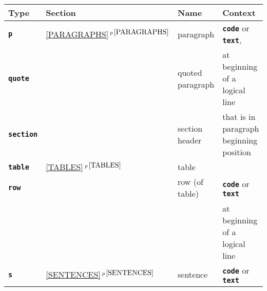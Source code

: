 \documentclass[12pt]{article}
\makeatletter
\newcommand{\TT}[1]{{\tt \bfseries #1}}
\newcommand{\ttkey}[1]{\TT{#1}\index{#1@{\tt #1}}}
\newcommand{\itemref}[1]{\ref{#1}$\,^{p\,\pageref{#1}}$}
\makeatother
\begin{document}
\begin{center}
\begin{tabular}{|l|l|l|l|}
\hline
\bf Type & \bf Section & \bf Name & \bf Context
\\\hline
\ttkey{p}	& \itemref{PARAGRAPHS} & paragraph
	& \TT{code} or \TT{text},
\\\cline{1-1}\cline{3-3}
\ttkey{quote}	& & quoted paragraph & at beginning of a logical line
\\\cline{1-1}\cline{3-3}
\ttkey{section}	& & section header & that is in paragraph beginning position
\\\cline{1-3}
\ttkey{table}	& \itemref{TABLES} & table &
\\\cline{1-1}\cline{3-4}
\ttkey{row}	& & row (of table) & \TT{code} or \TT{text} \\
		& &		   & at beginning of a logical line
\\\hline
\ttkey{s}	& \itemref{SENTENCES}& sentence & \TT{code} or \TT{text}
\\\hline
\end{tabular}
\end{center}
\end{document}
